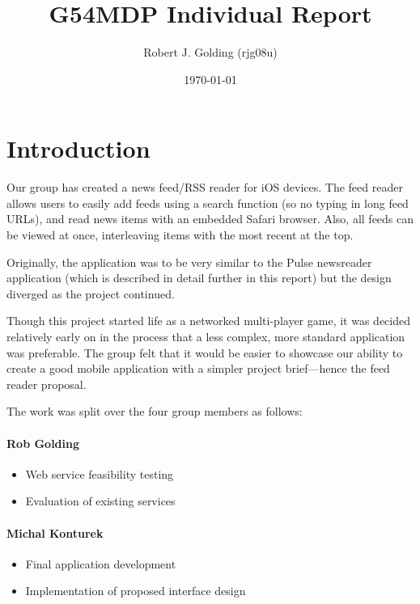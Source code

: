 \documentclass[a4paper,11pt]{article}
\title{G54MDP Individual Report}
\author{Robert J. Golding (rjg08u)} \date{\today}
\begin{document}
    \maketitle

    \section{Introduction}

    Our group has created a news feed/RSS reader for iOS devices. The feed
    reader allows users to easily add feeds using a search function (so no
    typing in long feed URLs), and read news items with an embedded Safari
    browser. Also, all feeds can be viewed at once, interleaving items with the
    most recent at the top.
    
    Originally, the application was to be very similar to the Pulse newsreader
    application (which is described in detail further in this report) but the
    design diverged as the project continued.

    Though this project started life as a networked multi-player game, it was
    decided relatively early on in the process that a less complex, more
    standard application was preferable. The group felt that it would be easier
    to showcase our ability to create a good mobile application with a simpler
    project brief---hence the feed reader proposal.

    The work was split over the four group members as follows:

    \paragraph{Rob Golding}

    \begin{itemize}
        \item Web service feasibility testing
        \item Evaluation of existing services
    \end{itemize}

    \paragraph{Michal Konturek}

    \begin{itemize}
        \item Final application development
        \item Implementation of proposed interface design
    \end{itemize}
\end{document}
